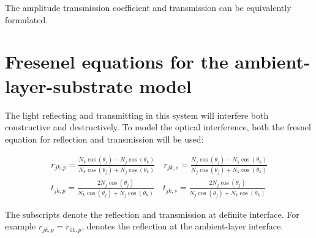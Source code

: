 \documentclass[MasterThesisMain.tex]{subfiles}
\begin{document}
The amplitude transmission coefficient and transmission can be equivalently formulated. 

\section{Fresenel equations for the ambient-layer-substrate model}
The light reflecting and transmitting in this system will interfere both constructive and destructively. To model the optical interference, both the fresnel equation for reflection and transmission will be used:

\begin{align}
r_{jk,p} = \frac{N_k\cos(\theta_j)-N_j\cos(\theta_k)}{N_k\cos(\theta_j)+N_j\cos(\theta_k)} \quad r_{jk,s} = \frac{N_j\cos(\theta_j)-N_k\cos(\theta_k)}{N_j\cos(\theta_j)+N_k\cos(\theta_k)} \\
t_{jk,p} = \frac{2N_j\cos(\theta_j)}{N_k\cos(\theta_j)+N_j\cos(\theta_k)} \quad t_{jk,s} = \frac{2N_j\cos(\theta_j)}{N_j\cos(\theta_j)+N_k\cos(\theta_k)} 
\end{align}

The subscripts denote the reflection and transmission at definite interface. For example $r_{jk,p} = r_{01,p}$, denotes the reflection at the ambient-layer interface.
        
\end{document}
